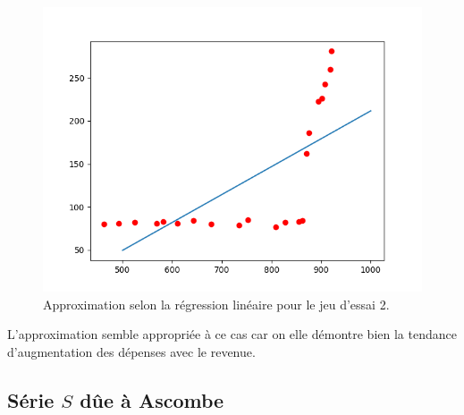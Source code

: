 \documentclass[12pt,french,titlepage]{article}
\begin{document}
		\begin{figure}[H]
		\includegraphics[width=\textwidth]{"23.png"}
		\caption{Approximation selon la régression linéaire pour le jeu d'essai 2.}
		\end{figure}
	
		L'approximation semble appropriée à ce cas car on elle démontre bien la tendance d'augmentation des dépenses avec le revenue.\\
	
		
		
	\subsection{Série $S$ dûe à Ascombe}
	
\end{document}
